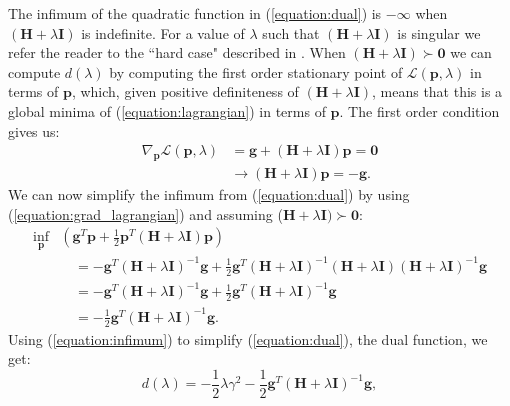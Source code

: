 \documentclass[letterpaper,12pt,titlepage,oneside,final]{book}
\begin{document}
	The infimum of the quadratic function in (\ref{equation:dual}) is $-\infty$ when $(\mathbf{H} + \lambda\mathbf{I})$ is indefinite. For a value of $\lambda$ such that $(\mathbf{H} + \lambda\mathbf{I})$ is singular we refer the reader to the ``hard case" described in \cite{adachi.paper}.  When $(\mathbf{H} + \lambda\mathbf{I}) \succ \mathbf{0}$ we can compute $d(\lambda)$ by computing the first order stationary point of $\mathcal{L}(\mathbf{p},\lambda)$ in terms of $\mathbf{p}$, which, given positive definiteness of $(\mathbf{H} + \lambda\mathbf{I})$, means that this is a global minima of (\ref{equation:lagrangian}) in terms of $\mathbf{p}$. The first order condition gives us:
	\begin{equation}
	\begin{aligned}
	\nabla_{\mathbf{p}} \mathcal{L}(\mathbf{p},\lambda) & = \mathbf{g} + (\mathbf{H} + \lambda\mathbf{I}) \mathbf{p} = \mathbf{0} \\
	& \rightarrow (\mathbf{H} + \lambda\mathbf{I})\mathbf{p} = -\mathbf{g}.
	\end{aligned}
	\label{equation:grad_lagrangian}
	\end{equation}
	We can now simplify the infimum from (\ref{equation:dual}) by using (\ref{equation:grad_lagrangian}) and assuming ($\mathbf{H} + \lambda\mathbf{I}) \succ \mathbf{0}$:
	\begin{equation}
	\begin{aligned}
	\underset{\mathbf{p}}{\inf}
	&(\mathbf{g}^{T}\mathbf{p} + \frac{1}{2}\mathbf{p}^{T}(\mathbf{H} + \lambda\mathbf{I})\mathbf{p}) \\ & \quad = -\mathbf{g}^{T}(\mathbf{H} + \lambda\mathbf{I})^{-1}\mathbf{g} + \frac{1}{2}\mathbf{g}^{T}(\mathbf{H} + \lambda\mathbf{I})^{-1}(\mathbf{H} + \lambda\mathbf{I})(\mathbf{H} + \lambda\mathbf{I})^{-1}\mathbf{g}   \\
	& \quad = -\mathbf{g}^{T}(\mathbf{H} + \lambda\mathbf{I})^{-1}\mathbf{g} + \frac{1}{2}\mathbf{g}^{T}(\mathbf{H} + \lambda\mathbf{I})^{-1}\mathbf{g} \\
	& \quad = - \frac{1}{2}\mathbf{g}^{T}(\mathbf{H} + \lambda\mathbf{I})^{-1}\mathbf{g}.
	\end{aligned}
	\label{equation:infimum}
	\end{equation}
	 Using (\ref{equation:infimum}) to simplify (\ref{equation:dual}), the dual function, we get:
	\begin{equation}
	d(\lambda)= 
	-\frac{1}{2}\lambda\gamma^{2} - \frac{1}{2}\mathbf{g}^{T}(\mathbf{H} + \lambda\mathbf{I})^{-1}\mathbf{g},
	\label{equation:dual2}
	\end{equation}
\end{document}
